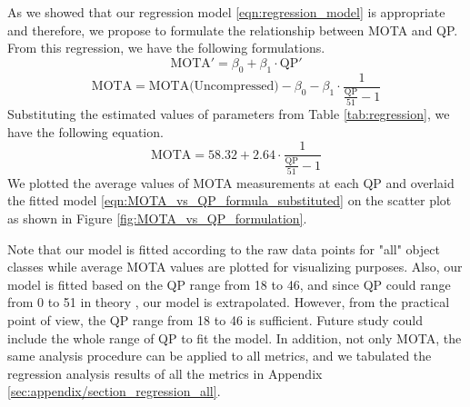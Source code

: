 As we showed that our regression model \eqref{eqn:regression_model} is appropriate and therefore, we propose to formulate the relationship between MOTA and QP. From this regression, we have the following formulations.
\begin{equation}
    \text{MOTA}' = \beta_0 + \beta_1 \cdot \text{QP}'
\end{equation}
\begin{equation}
    \text{MOTA} = \text{MOTA(Uncompressed)} - \beta_0 - \beta_1 \cdot \frac{1}{ \frac{\text{QP}}{51} - 1 }
\label{eqn:MOTA_vs_QP_formula}
\end{equation}
Substituting the estimated values of parameters from Table \ref{tab:regression}, we have the following equation.
\begin{equation}
    \text{MOTA} = 58.32 + 2.64 \cdot \frac{1}{ \frac{\text{QP}}{51} - 1 }
\label{eqn:MOTA_vs_QP_formula_substituted}
\end{equation}
We plotted the average values of MOTA measurements at each QP and overlaid the fitted model \ref{eqn:MOTA_vs_QP_formula_substituted} on the scatter plot as shown in Figure \ref{fig:MOTA_vs_QP_formulation}.

Note that our model is fitted according to the raw data points for "all" object classes while average MOTA values are plotted for visualizing purposes. Also, our model is fitted based on the QP range from 18 to 46, and since QP could range from 0 to 51 in theory \cite{sullivan_overview_2012}, our model is extrapolated. However, from the practical point of view, the QP range from 18 to 46 is sufficient. Future study could include the whole range of QP to fit the model. In addition, not only MOTA, the same analysis procedure can be applied to all metrics, and we tabulated the regression analysis results of all the metrics in Appendix \ref{sec:appendix/section_regression_all}.


